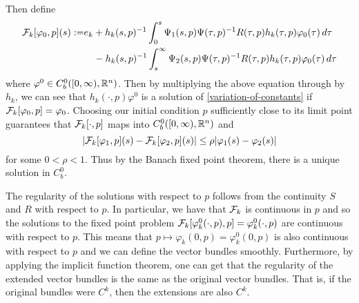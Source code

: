 Then define
\begin{equation}
\begin{aligned}
	\mathcal{F}_k[\varphi_0, p](s) :=& e_k + h_k(s,p)^{-1}\int_0^s \Psi_1(s, p) \Psi(\tau, p)^{-1}R(\tau, p) h_k(\tau,p)\varphi_0(\tau)\, d\tau \\
	&\quad - h_k(s,p)^{-1}\int_s^\infty \Psi_2(s,p) \Psi(\tau, p)^{-1} R(\tau, p)h_k(\tau,p) \varphi_0(\tau)\, d\tau
\end{aligned}
\end{equation}
where \(\varphi^0\in C^0_b([0,\infty), \mathbb{R}^n)\). Then by multiplying the above equation through by \(h_k\), we can see that \(h_k(\cdot, p)\varphi^0\) is a solution of \cref{variation-of-constants} if \(\mathcal{F}_k[\varphi_0, p] = \varphi_0\). Choosing our initial condition \(p\) sufficiently close to its limit point guarantees that \(\mathcal{F}_k[\cdot, p]\) maps into \(C^0_b([0,\infty), \mathbb{R}^n)\) and
\begin{equation}
	|\mathcal{F}_k[\varphi_1, p](s) - \mathcal{F}_k[\varphi_2, p](s) | \leq \rho  |\varphi_1(s) - \varphi_2(s)| 
\end{equation}
for some \(0< \rho < 1\). Thus by the Banach fixed point theorem, there is a unique solution in \(C^0_b\).

The regularity of the solutions with respect to \(p\) follows from the continuity \(S\) and \(R\) with respect to \(p\). In particular, we have that \(\mathcal{F}_k\) is continuous in \(p\) and so the solutions to the fixed point problem \(\mathcal{F}_k[\varphi_k^0(\cdot, p) , p] = \varphi_k^0(\cdot, p)\) are continuous with respect to \(p\). This means that \(p\mapsto \varphi_k(0,p) = \varphi_k^0(0,p) \) is also continuous with respect to \(p\) and we can define the vector bundles smoothly. Furthermore, by applying the implicit function theorem, one can get that the regularity of the extended vector bundles is the same as the original vector bundles. That is, if the original bundles were \(C^k\), then the extensions are also \(C^k\).

